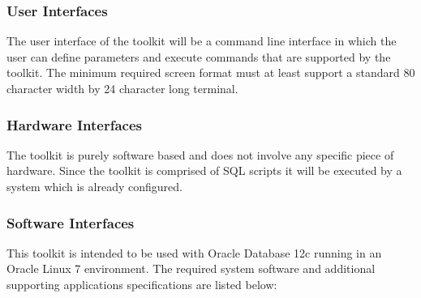 \documentclass[draftclsnofoot, onecolumn, compsoc, 10pt]{IEEEtran}
\begin{document}
\subsubsection{User Interfaces}
The user interface of the toolkit will be a command line interface in which the user can define parameters and execute commands that are supported by the toolkit.
The minimum required screen format must at least support a standard 80 character width by 24 character long terminal.

\subsubsection{Hardware Interfaces}
The toolkit is purely software based and does not involve any specific piece of hardware.
Since the toolkit is comprised of SQL scripts it will be executed by a system which is already configured. 

\subsubsection{Software Interfaces}
This toolkit is intended to be used with Oracle Database 12c running in an Oracle Linux 7 environment.
The required system software and additional supporting applications specifications are listed below:
\end{document}
